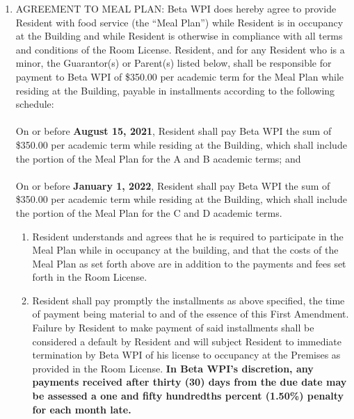 \documentclass[legalpaper, 12pt]{article}
\begin{document}
\begin{enumerate}
        \item AGREEMENT TO MEAL PLAN\@: Beta WPI does hereby agree to provide
                Resident with food service (the ``Meal Plan'') while Resident is
                in occupancy at the Building and while Resident is otherwise in
                compliance with all terms and conditions of the Room License.
                Resident, and for any Resident who is a minor, the Guarantor(s)
                or Parent(s) listed below, shall be responsible for payment to
                Beta WPI of \$350.00 per academic term for the Meal Plan while
                residing at the Building, payable in installments according to
                the following schedule:\\\\
                On or before \textbf{August 15, 2021}, Resident shall pay Beta
                WPI the sum of \$350.00 per academic term while residing at the
                Building, which shall include the portion of the Meal Plan for
                the A and B academic terms; and\\\\
                On or before \textbf{January 1, 2022}, Resident shall pay Beta
                WPI the sum of \$350.00 per academic term while residing at the
                Building, which shall include the portion of the Meal Plan for
                the C and D academic terms.
                \begin{enumerate}[label=\Alph*.]

                        \item Resident understands and agrees that he is
                                required to participate in the Meal Plan while
                                in occupancy at the building, and that the costs
                                of the Meal Plan as set forth above are in
                                addition to the payments and fees set forth in
                                the Room License.

                        \item Resident shall pay promptly the installments as
                                above specified, the time of payment being
                                material to and of the essence of this First
                                Amendment. Failure by Resident to make payment
                                of said installments shall be considered a
                                default by Resident and will subject Resident to
                                immediate termination by Beta WPI of his
                                license to occupancy at the Premises as provided
                                in the Room License. \textbf{In Beta WPI's
                                discretion, any payments received after thirty
                                (30) days from the due date may be assessed a
                                one and fifty hundredths percent (1.50\%)
                                penalty for each month late.}


\end{enumerate}
\end{enumerate}
\end{document}
